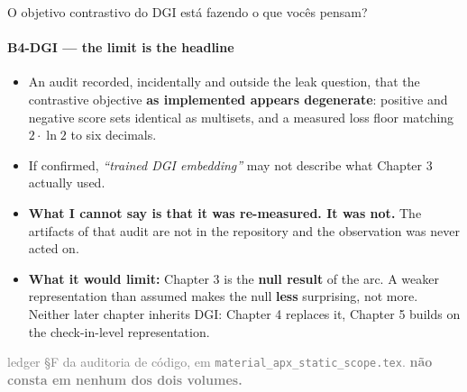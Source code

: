 \documentclass{beamer}
\begin{document}
\begin{frame}[noframenumbering]{O objetivo contrastivo do DGI está fazendo o que vocês pensam?}
    \framesubtitle{B4-DGI --- the limit is the headline}
    \hypertarget{b4dgi}{}
    \small
    \begin{itemize}\setlength{\itemsep}{0pt}\setlength{\parskip}{0pt}
        \item An audit recorded, incidentally and outside the leak question, that the contrastive objective \textbf{as implemented appears degenerate}: positive and negative score sets identical as multisets, and a measured loss floor matching $2\cdot\ln 2$ to six decimals.
        \item If confirmed, \textit{``trained DGI embedding''} may not describe what Chapter 3 actually used.
        \item \textcolor{alert}{\textbf{What I cannot say is that it was re-measured. It was not.}} The artifacts of that audit are not in the repository and the observation was never acted on.
        \item \textbf{What it would limit:} Chapter 3 is the \textbf{null result} of the arc. A weaker representation than assumed makes the null \textbf{less} surprising, not more. Neither later chapter inherits DGI: Chapter 4 replaces it, Chapter 5 builds on the check-in-level representation.
    \end{itemize}
    \vfill
    {\scriptsize
    \begin{minipage}[b]{0.775\linewidth}\raggedright\textcolor{gray}{ledger §F da auditoria de código, em \texttt{material\_apx\_static\_scope.tex}. \textbf{não consta em nenhum dos dois volumes.}}\end{minipage}\hfill
    \begin{minipage}[b]{0.20\linewidth}\raggedleft \hyperlink{b0}{}\end{minipage}}
\end{frame}
\end{document}

